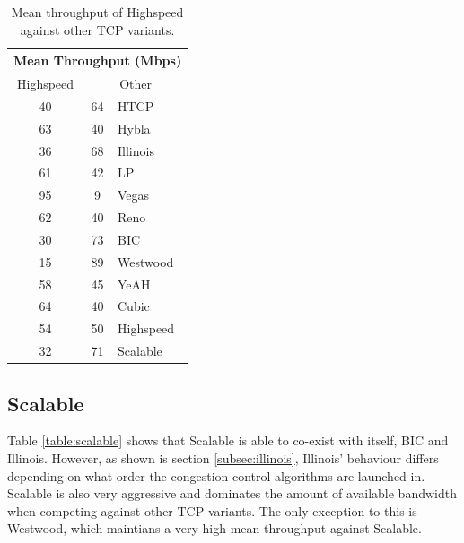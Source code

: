 \documentclass[11pt,a4paper,twocolumn]{article}
\begin{document}
\begin{table}[h!]
	\begin{center}
		\begin{tabular}{| c | c | l |}
    			\hline
			\multicolumn{3}{|c|}{Mean Throughput (Mbps)} \\
    			\hline
    			Highspeed &  \multicolumn{2}{|c|}{Other}  \\
			\hline
    			40 & 64 & HTCP \\
			\hline
    			63 & 40 & Hybla \\
			\hline
    			36 & 68 & Illinois \\
			\hline
    			61 & 42 & LP \\
			\hline
    			95 & 9 & Vegas \\
			\hline
    			62 & 40 & Reno \\
			\hline
    			30 & 73 & BIC \\
			\hline
    			15 & 89 & Westwood \\
			\hline
    			58 & 45 & YeAH \\
			\hline
    			64 & 40 & Cubic \\
			\hline
    			54 & 50 & Highspeed \\
			\hline
    			32 & 71 & Scalable \\
    			\hline
    		\end{tabular}
  	\end{center}
  	\caption{Mean throughput of Highspeed against other TCP variants.}
	\label{table:highspeed}
\end{table}

\subsection{Scalable}
\label{subsec:scalable}
Table \ref{table:scalable} shows that Scalable is able to co-exist with itself, BIC and Illinois. However, as shown
is section \ref{subsec:illinois}, Illinois' behaviour differs depending on what order the congestion control algorithms
are launched in. Scalable is also very aggressive and dominates the amount of available bandwidth when competing
against other TCP variants. The only exception to this is Westwood, which maintians a very high mean
throughput against Scalable.
\end{document}
